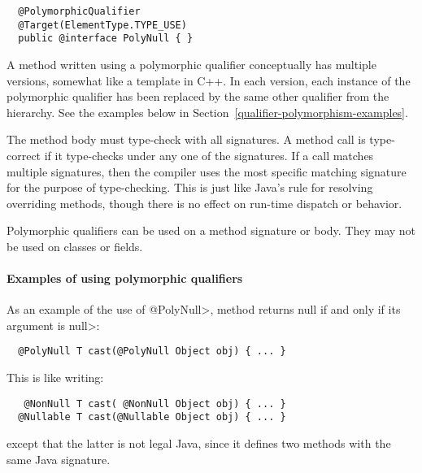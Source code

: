 \begin{Verbatim}
  @PolymorphicQualifier
  @Target(ElementType.TYPE_USE)
  public @interface PolyNull { }
\end{Verbatim}

A method written using a polymorphic qualifier conceptually has multiple
versions, somewhat like a template in C++.  In each version, each instance
of the polymorphic qualifier has been replaced by the same other qualifier
from the
hierarchy.  See the examples below in Section~\ref{qualifier-polymorphism-examples}.

The method body must type-check with all signatures.  A method call is
type-correct if it type-checks under any one of the signatures.  If a call
matches multiple signatures, then the compiler uses the most specific
matching signature for the purpose of type-checking.  This is just like
Java's rule for resolving overriding methods, though there is no effect on
run-time dispatch or behavior.

Polymorphic qualifiers can be used on a method signature or body.
They may not be used on classes or fields.



\paragraph{Examples of using polymorphic qualifiers\label{qualifier-polymorphism-examples}}

As an example of the use of \<@PolyNull>, method 
returns null if and only if its argument is \<null>:

\begin{Verbatim}
  @PolyNull T cast(@PolyNull Object obj) { ... }
\end{Verbatim}

\noindent
This is like writing:

\begin{Verbatim}
   @NonNull T cast( @NonNull Object obj) { ... }
  @Nullable T cast(@Nullable Object obj) { ... }
\end{Verbatim}

\noindent
except that the latter is not legal Java, since it defines two
methods with the same Java signature.


